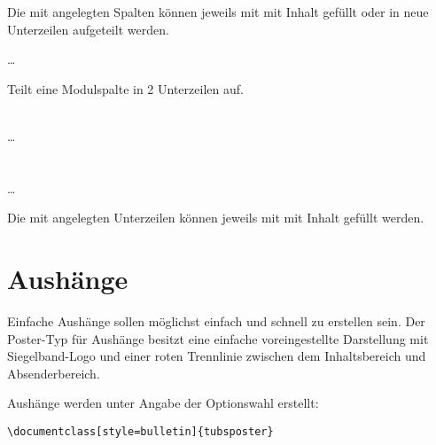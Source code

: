 Die mit  angelegten Spalten können jeweils mit 
 mit Inhalt gefüllt oder in neue Unterzeilen aufgeteilt 
werden.

\begin{minipage}{0.6\textwidth}
\begin{Example}\par
  \noindent{}
    \par
  \quad\dots\\
  \bigskip\par
  \noindent Teilt eine Modulspalte in 2 Unterzeilen auf.
\end{Example}
\end{minipage}
\hfill
\begin{minipage}{0.3\textwidth}\centering
\end{minipage}


\begin{Declaration}
  \\%
  \quad\dots\\
  \\
  \\%
  \quad\dots\\
\end{Declaration}

Die mit  angelegten Unterzeilen können jeweils mit 
 mit Inhalt gefüllt werden.


\clearpage
\section{Aushänge}

Einfache Aushänge sollen möglichst einfach und schnell zu erstellen sein.
Der Poster-Typ für Aushänge besitzt eine einfache voreingestellte Darstellung
mit Siegelband-Logo und einer roten Trennlinie zwischen dem Inhaltsbereich
und Absenderbereich.

Aushänge werden unter Angabe der Optionswahl
 erstellt:
\begin{lstlisting}
\documentclass[style=bulletin]{tubsposter}
\end{lstlisting}

